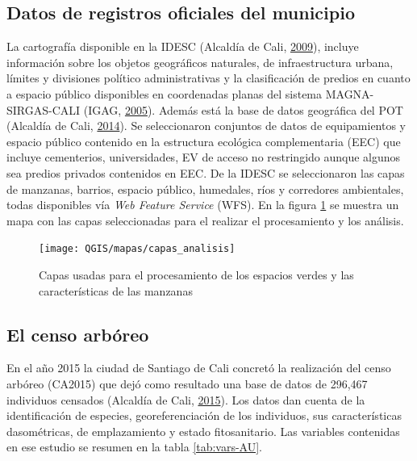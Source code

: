 \documentclass[12pt,a4paper,openany]{book}
\theoremstyle{definition}
\theoremstyle{definition}
\theoremstyle{definition}
\theoremstyle{remark}
\begin{document}
\subsection{Datos de registros oficiales del
municipio}\label{datos-de-registros-oficiales-del-municipio}

La cartografía disponible en la IDESC (Alcaldía de Cali,
\protect\hyperlink{ref-geoportal_idesc}{2009}), incluye información
sobre los objetos geográficos naturales, de infraestructura urbana,
límites y divisiones político administrativas y la clasificación de
predios en cuanto a espacio público disponibles en coordenadas planas
del sistema MAGNA-SIRGAS-CALI (IGAG,
\protect\hyperlink{ref-igagMC2005}{2005}). Además está la base de datos
geográfica del POT (Alcaldía de Cali,
\protect\hyperlink{ref-pot2014cali}{2014}). Se seleccionaron conjuntos
de datos de equipamientos y espacio público contenido en la estructura
ecológica complementaria (EEC) que incluye cementerios, universidades,
EV de acceso no restringido aunque algunos sea predios privados
contenidos en EEC. De la IDESC se seleccionaron las capas de manzanas,
barrios, espacio público, humedales, ríos y corredores ambientales,
todas disponibles vía \emph{Web Feature Service} (WFS). En la figura
\ref{fig:capas-idesc} se muestra un mapa con las capas seleccionadas
para el realizar el procesamiento y los análisis.

\begin{figure}[H]

{\centering \texttt{[image: QGIS/mapas/capas\_analisis]} 

}

\caption{Capas usadas para el procesamiento de los espacios verdes y las características de las manzanas}\label{fig:capas-idesc}
\end{figure}

\subsection{El censo arbóreo}\label{el-censo-arbuxf3reo}

En el año 2015 la ciudad de Santiago de Cali concretó la realización del
censo arbóreo (CA2015) que dejó como resultado una base de datos de
296,467 individuos censados (Alcaldía de Cali,
\protect\hyperlink{ref-ca2015cali}{2015}). Los datos dan cuenta de la
identificación de especies, georeferenciación de los individuos, sus
características dasométricas, de emplazamiento y estado fitosanitario.
Las variables contenidas en ese estudio se resumen en la tabla
\ref{tab:vars-AU}.
\end{document}
